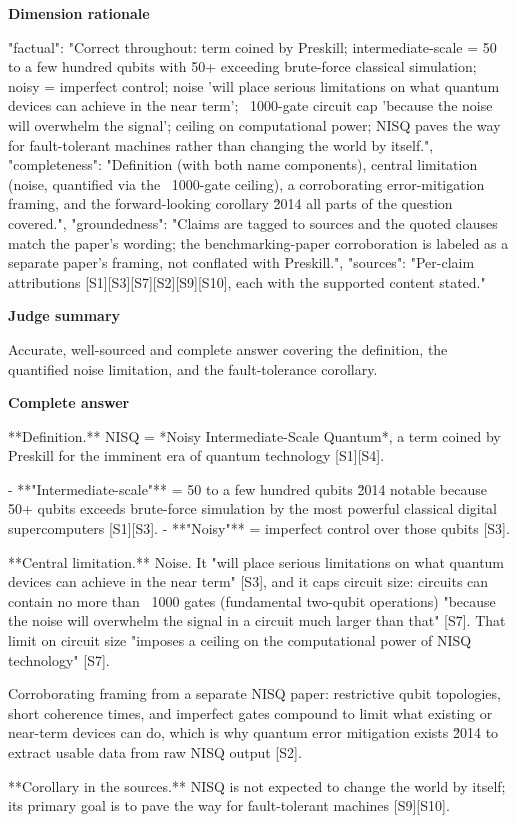 \documentclass[10pt]{article}
\begin{document}
\textbf{Dimension rationale}
\begin{EvidenceText}
{
  "factual": "Correct throughout: term coined by Preskill; intermediate-scale = 50 to a few hundred qubits with 50+ exceeding brute-force classical simulation; noisy = imperfect control; noise 'will place serious limitations on what quantum devices can achieve in the near term'; ~1000-gate circuit cap 'because the noise will overwhelm the signal'; ceiling on computational power; NISQ paves the way for fault-tolerant machines rather than changing the world by itself.",
  "completeness": "Definition (with both name components), central limitation (noise, quantified via the ~1000-gate ceiling), a corroborating error-mitigation framing, and the forward-looking corollary \u2014 all parts of the question covered.",
  "groundedness": "Claims are tagged to sources and the quoted clauses match the paper's wording; the benchmarking-paper corroboration is labeled as a separate paper's framing, not conflated with Preskill.",
  "sources": "Per-claim attributions [S1][S3][S7][S2][S9][S10], each with the supported content stated."
}
\end{EvidenceText}

\textbf{Judge summary}
\begin{EvidenceText}
Accurate, well-sourced and complete answer covering the definition, the quantified noise limitation, and the fault-tolerance corollary.
\end{EvidenceText}

\textbf{Complete answer}
\begin{AnswerText}
**Definition.** NISQ = *Noisy Intermediate-Scale Quantum*, a term coined by Preskill for the imminent era of quantum technology [S1][S4].

- **"Intermediate-scale"** = 50 to a few hundred qubits \u2014 notable because 50+ qubits exceeds brute-force simulation by the most powerful classical digital supercomputers [S1][S3].
- **"Noisy"** = imperfect control over those qubits [S3].

**Central limitation.** Noise. It "will place serious limitations on what quantum devices can achieve in the near term" [S3], and it caps circuit size: circuits can contain no more than ~1000 gates (fundamental two-qubit operations) "because the noise will overwhelm the signal in a circuit much larger than that" [S7]. That limit on circuit size "imposes a ceiling on the computational power of NISQ technology" [S7].

Corroborating framing from a separate NISQ paper: restrictive qubit topologies, short coherence times, and imperfect gates compound to limit what existing or near-term devices can do, which is why quantum error mitigation exists \u2014 to extract usable data from raw NISQ output [S2].

**Corollary in the sources.** NISQ is not expected to change the world by itself; its primary goal is to pave the way for fault-tolerant machines [S9][S10].
\end{AnswerText}
\end{document}
